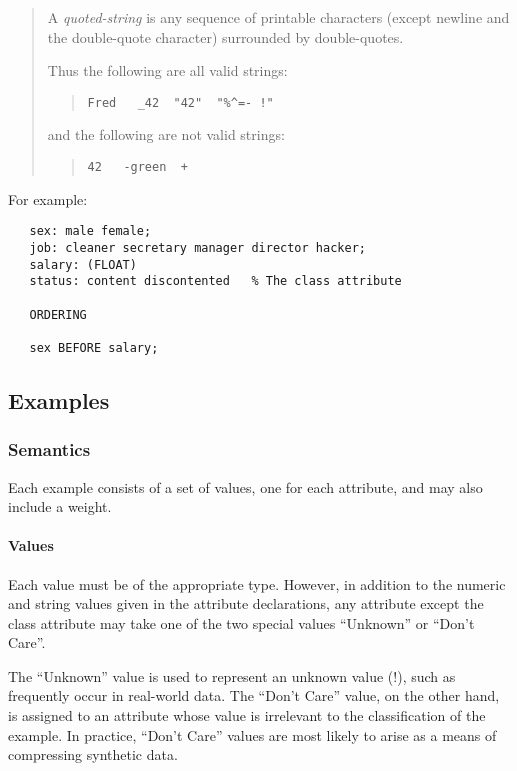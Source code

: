 \begin{quotation}
A {\it quoted-string} is any sequence of printable characters (except
newline and the double-quote character) surrounded by double-quotes.

Thus the following are all valid strings:
\begin{quotation}
\begin{verbatim}
Fred   _42  "42"  "%^=- !"
\end{verbatim}
\end{quotation}
and the following are not valid strings:
\begin{quotation}
\begin{verbatim}
42   -green  + 
\end{verbatim}
\end{quotation}
\end{quotation}

For example:

\begin{verbatim}
   sex: male female;
   job: cleaner secretary manager director hacker;
   salary: (FLOAT)
   status: content discontented   % The class attribute

   ORDERING

   sex BEFORE salary;

\end{verbatim}

\subsection{Examples}
\subsubsection{Semantics} 
Each example consists of a set of values, one for each attribute,
and may also include a weight.

\paragraph{Values}
Each value must be of the appropriate type.  However, in addition
to the numeric and string values given in the attribute declarations,
any attribute except the class attribute may take
one of the two special values ``Unknown'' or ``Don't Care''.

The ``Unknown'' value
is used to represent an unknown value (!), such as frequently 
occur in real-world data.
The ``Don't Care'' value, on the other hand, is assigned to
an attribute whose value is irrelevant to the classification 
of the example.  In practice, ``Don't Care'' values are
most likely to arise as a means of compressing synthetic data.

